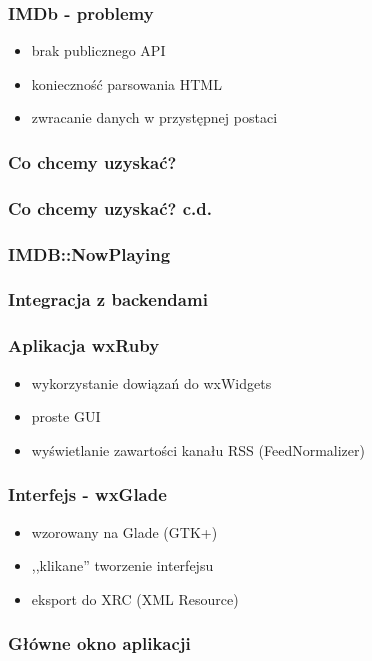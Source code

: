 \documentclass[12t]{beamer}
\begin{document}
\begin{frame}
  \frametitle{IMDb - problemy}
  \begin{itemize}
  \item brak publicznego API
  \item konieczność parsowania HTML
  \item zwracanie danych w przystępnej postaci
  \end{itemize}
\end{frame}

\begin{frame}[fragile]
  \frametitle{Co chcemy uzyskać?}
  
\end{frame}

\begin{frame}[fragile]
  \frametitle{Co chcemy uzyskać? c.d.}
  
\end{frame}

\begin{frame}[fragile]
  \frametitle{IMDB::NowPlaying}
  \begin{footnotesize}
    
  \end{footnotesize}
\end{frame}

\begin{frame}[fragile]
  \frametitle{Integracja z backendami}
  
\end{frame}

\begin{frame}
  \frametitle{Aplikacja wxRuby}
  \begin{itemize}
  \item wykorzystanie dowiązań do wxWidgets
  \item proste GUI
  \item wyświetlanie zawartości kanału RSS (FeedNormalizer)
  \end{itemize}
\end{frame}

\begin{frame}
  \frametitle{Interfejs - wxGlade}
  \begin{itemize}
  \item wzorowany na Glade (GTK+)
  \item ,,klikane'' tworzenie interfejsu
  \item eksport do XRC (XML Resource)
  \end{itemize}
\end{frame}

\begin{frame}[fragile]
  \frametitle{Główne okno aplikacji}
  \begin{tiny}
    
  \end{tiny}
\end{frame}
\end{document}
